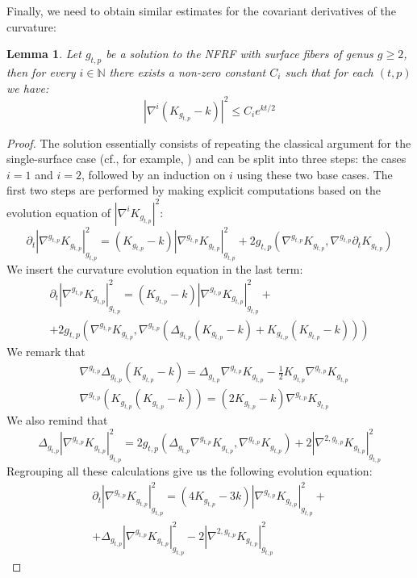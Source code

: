 \documentclass{article}
\theoremstyle{plain}
\newtheorem{lem}{Lemma}[section]
\theoremstyle{remark}
\theoremstyle{definition}
\begin{document}
Finally, we need to obtain similar estimates for the covariant derivatives of the curvature\thinspace:
\begin{lem}
    Let $g_{t,p}$ be a solution to the NFRF with surface fibers of genus $g\geq 2$, then for every $i\in \mathbb{N}$ there exists a non-zero constant $C_i$ such that for each $(t,p)$ we have\thinspace:
    $$|\nabla^i (K_{g_{t,p}}-k)|^2 \leq C_i e^{kt/2}$$ 
\end{lem}
\begin{proof}
    The solution essentially consists of repeating the classical argument for the single-surface case (cf., for example, \cite[Section 6, Chapter 5]{ChowKnopf}) and can be split into three steps\thinspace: the cases $i=1$ and $i=2$, followed by an induction on $i$ using these two base cases. The first two steps are performed by making explicit computations based on the evolution equation of $|\nabla^i K_{g_{t,p}}|^2$\thinspace:
    $$
        \partial_t|\nabla^{g_{t,p}} K_{g_{t,p}}|^2_{g_{t,p}}=(K_{g_{t,p}}-k)|\nabla^{g_{t,p}} K_{g_{t,p}}|^2_{g_{t,p}}+2g_{t,p}(\nabla^{g_{t,p}} K_{g_{t,p}},\nabla^{g_{t,p}} \partial_t K_{g_{t,p}})
    $$
    We insert the curvature evolution equation in the last term\thinspace:
    \begin{multline*}
        \partial_t|\nabla^{g_{t,p}} K_{g_{t,p}}|^2_{g_{t,p}}=(K_{g_{t,p}}-k)|\nabla^{g_{t,p}} K_{g_{t,p}}|^2_{g_{t,p}}+ \\ +2g_{t,p}(\nabla^{g_{t,p}} K_{g_{t,p}},\nabla^{g_{t,p}} (\Delta_{g_{t,p}}(K_{g_{t,p}}-k)+K_{g_{t,p}}(K_{g_{t,p}}-k)))
    \end{multline*}
    We remark that 
    \begin{align*}
        &\nabla^{g_{t,p}} \Delta_{g_{t,p}}(K_{g_{t,p}}-k)=\Delta_{g_{t,p}}\nabla^{g_{t,p}}K_{g_{t,p}}-\frac{1}{2}K_{g_{t,p}}\nabla^{g_{t,p}}K_{g_{t,p}} \\
        &\nabla^{g_{t,p}}(K_{g_{t,p}}(K_{g_{t,p}}-k))=(2K_{g_{t,p}}-k)\nabla^{g_{t,p}}K_{g_{t,p}}
    \end{align*}
    We also remind that 
    $$\Delta_{g_{t,p}} |\nabla^{g_{t,p}} K_{g_{t,p}}|^2_{g_{t,p}}=2g_{t,p}(\Delta_{g_{t,p}}\nabla^{g_{t,p}}K_{g_{t,p}},\nabla^{g_{t,p}}K_{g_{t,p}})+2|\nabla^{2,g_{t,p}} K_{g_{t,p}}|^2_{g_{t,p}}$$
    Regrouping all these calculations give us the following evolution equation\thinspace:
    \begin{multline*}
        \partial_t|\nabla^{g_{t,p}} K_{g_{t,p}}|^2_{g_{t,p}} = (4K_{g_{t,p}}-3k)|\nabla^{g_{t,p}} K_{g_{t,p}}|^2_{g_{t,p}}+\\+\Delta_{g_{t,p}} |\nabla^{g_{t,p}} K_{g_{t,p}}|^2_{g_{t,p}}-2|\nabla^{2,g_{t,p}} K_{g_{t,p}}|^2_{g_{t,p}}

\end{multline*}
\end{proof}
\end{document}
